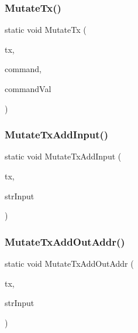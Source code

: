 \mbox{\label{bitcoin-tx_8cpp_ab7ebe37e92de4ef2ff4c3b547b1495c3}} 
\subsubsection{\texorpdfstring{Mutate\+Tx()}{MutateTx()}}
{\footnotesize\ttfamily static void Mutate\+Tx (\begin{DoxyParamCaption}\item[{C\+Mutable\+Transaction \&}]{tx,  }\item[{const string \&}]{command,  }\item[{const string \&}]{command\+Val }\end{DoxyParamCaption})\hspace{0.3cm}{\ttfamily [static]}}

\mbox{\label{bitcoin-tx_8cpp_a54211e2ff2d8fcc5b0c3c1b439d392a4}} 
\subsubsection{\texorpdfstring{Mutate\+Tx\+Add\+Input()}{MutateTxAddInput()}}
{\footnotesize\ttfamily static void Mutate\+Tx\+Add\+Input (\begin{DoxyParamCaption}\item[{C\+Mutable\+Transaction \&}]{tx,  }\item[{const string \&}]{str\+Input }\end{DoxyParamCaption})\hspace{0.3cm}{\ttfamily [static]}}

\mbox{\label{bitcoin-tx_8cpp_af42e5437bd7f7d997f4bd789186684ce}} 
\subsubsection{\texorpdfstring{Mutate\+Tx\+Add\+Out\+Addr()}{MutateTxAddOutAddr()}}
{\footnotesize\ttfamily static void Mutate\+Tx\+Add\+Out\+Addr (\begin{DoxyParamCaption}\item[{C\+Mutable\+Transaction \&}]{tx,  }\item[{const string \&}]{str\+Input }\end{DoxyParamCaption})\hspace{0.3cm}{\ttfamily [static]}}

